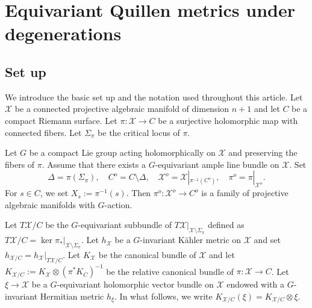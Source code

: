 \documentclass[amscd, leqno]{amsart}
\theoremstyle{plain}
\theoremstyle{definition}
\theoremstyle{remark}
\begin{document}
\section
{Equivariant Quillen metrics under degenerations}
\label{sect:3}
\par


\subsection
{Set up}
\label{sect:3.1}
\par
We introduce the basic set up and the notation used throughout this article.
Let ${\mathcal X}$ be a connected projective algebraic manifold of dimension $n+1$ and let $C$ be a compact Riemann surface.
Let $\pi\colon{\mathcal X}\to C$ be a surjective holomorphic map with connected fibers. Let $\Sigma_{\pi}$ be the critical locus of $\pi$.
\par
Let $G$ be a compact Lie group acting holomorphically on ${\mathcal X}$ and preserving the fibers of $\pi$. 
Assume that there exists a $G$-equivariant ample line bundle on ${\mathcal X}$.
Set 
$$
\Delta=\pi(\Sigma_{\pi}), 
\quad
C^{o}=C\setminus\Delta, 
\quad
{\mathcal X}^{o}={\mathcal X}|_{\pi^{-1}(C^{o})}, 
\quad
\pi^{o}=\pi|_{{\mathcal X}^{o}}.
$$
For $s\in C$, we set $X_{s}:=\pi^{-1}(s)$. 
Then $\pi^{o}\colon{\mathcal X}^{o}\to C^{o}$ is a family of projective algebraic manifolds with $G$-action.
\par
Let $T{\mathcal X}/C$ be the $G$-equivariant subbundle of $T{\mathcal X}|_{{\mathcal X}\setminus\Sigma_{\pi}}$ defined as
$T{\mathcal X}/C=\ker\pi_{*}|_{{\mathcal X}\setminus\Sigma_{\pi}}$.
Let $h_{\mathcal X}$ be a $G$-invariant K\"ahler metric on ${\mathcal X}$ and set $h_{{\mathcal X}/C}=h_{\mathcal X}|_{T{\mathcal X}/C}$.
Let $K_{\mathcal X}$ be the canonical bundle of ${\mathcal X}$ and let $K_{{\mathcal X}/C} := K_{\mathcal X}\otimes(\pi^{*} K_{C})^{-1}$ be the relative canonical bundle of $\pi\colon{\mathcal X}\to C$. Let $\xi\to{\mathcal X}$ be a $G$-equivariant holomorphic vector bundle on ${\mathcal X}$ endowed with a $G$-invariant Hermitian metric $h_{\xi}$. In what follows, we write $K_{{\mathcal X}/C}(\xi) = K_{{\mathcal X}/C}\otimes\xi$. 
\end{document}
